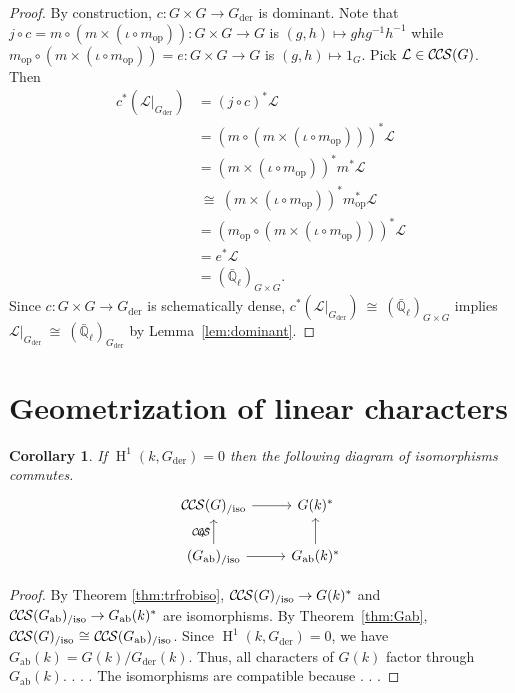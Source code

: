 \documentclass[10pt]{amsart}
\theoremstyle{plain}
\newtheorem{corollary}[theorem]{Corollary}
\theoremstyle{definition}
\newcommand{\EE}{\mathbb{\bar Q}_\ell}
\newcommand{\Fq}{k}
\DeclareMathOperator{\Hh}{H}
\newcommand{\op}{_{\operatorname{op}}}
\newcommand{\der}{_{\operatorname{der}}}
\newcommand{\ab}{_{\operatorname{ab}}}
\newcommand{\iso}{{\ \cong\ }}
\newcommand{\cs}[1]{{\mathcal{#1}}}
\newcommand{\CS}{{\mathcal{C\hskip-0.8pt S}}}
\newcommand{\CCS}{{\mathcal{C\hskip-.8pt C\hskip-0.8pt S}}}
\newcommand{\CCSiso}[1]{\CCS(#1)_{/\text{iso}}}
\begin{document}
\begin{proof}
By construction, $c : G \times G \to G\der$ is dominant. 
Note that $j\circ c = m\circ (m \times (\iota\circ m\op)) : G \times G \to G$ is $(g,h) \mapsto gh g^{-1}h^{-1}$ while $m\op\circ (m \times (\iota\circ m\op))= e : G \times G \to G$ is $(g,h) \mapsto 1_G$. 
Pick $\cs{L}\in \CCS(G)$. 
Then
\begin{align*}
c^* (\cs{L}\vert_{G\der})
&=  (j\circ c)^*\cs{L} \\
&= (m\circ (m \times (\iota\circ m\op)))^* \cs{L} \\
&= (m \times (\iota\circ m\op))^* m^* \cs{L} \\
&\iso (m \times (\iota\circ m\op))^* m\op^* \cs{L} \\
&= (m\op\circ (m \times (\iota\circ m\op)))^* \cs{L} \\
&= e^* \cs{L}\\
&= (\EE)_{G\times G}.
\end{align*}
Since $c : G \times G \to G\der$ is schematically dense, $c^* (\cs{L}\vert_{G\der}) \iso (\EE)_{G\times G}$ implies $\cs{L}\vert_{G\der} \iso (\EE)_{G\der}$ by Lemma~\ref{lem:dominant}. 

\end{proof}

\section{Geometrization of linear characters}


 \begin{corollary}
 If $\Hh^1(\Fq,G\der)=0$ then
the following diagram of isomorphisms commutes.
\[
\begin{tikzcd}
\CCSiso{G} \arrow{r} & G(\Fq)^*\\
\arrow{u}{q^*} \CCSiso{G\ab} \arrow{r} & \arrow{u} G\ab(\Fq)^* 
\end{tikzcd}
\]
 \end{corollary}
 
 \begin{proof}
 By Theorem \ref{thm:trfrobiso}, $\CCSiso{G}\to G(\Fq)^*$ and $\CCSiso{G\ab}\to G\ab(\Fq)^*$ are isomorphisms.
By Theorem~\ref{thm:Gab}, $\CCSiso{G} \iso \CCSiso{G\ab}$.
Since $\Hh^1(\Fq,G\der)=0$, we have  $G\ab(\Fq) = G(\Fq)/G\der(\Fq)$.
Thus, all characters of $G(\Fq)$ factor through
 $G\ab(\Fq)$. . . . 
 The isomorphisms are compatible because  . . . 
 \end{proof}
\end{document}
